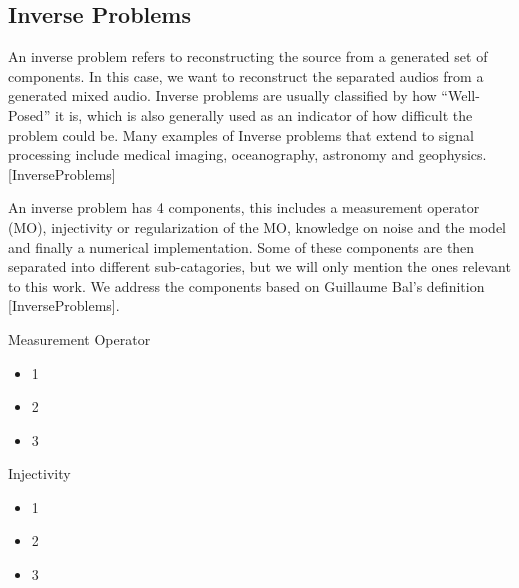 \documentclass{book}
\begin{document}
\subsection{Inverse Problems}
\qquad An inverse problem refers to reconstructing the source from a generated set of components.
In this case, we want to reconstruct the separated audios from a generated mixed audio.
Inverse problems are usually classified by how “Well-Posed” it is, which is also generally used as an indicator of how difficult the problem could be.
Many examples of Inverse problems that extend to signal processing include medical imaging, oceanography, astronomy and geophysics. [InverseProblems]
\par
An inverse problem has 4 components, this includes a measurement operator (MO), injectivity or regularization of the MO, knowledge on noise and the model and finally a numerical implementation.
Some of these components are then separated into different sub-catagories, but we will only mention the ones relevant to this work.
We address the components based on Guillaume Bal’s definition [InverseProblems].

\begin{center}
\noindent Measurement Operator
\end{center}
\begin{itemize}
    \item 1
    \item 2
    \item 3
\end{itemize}

\begin{center}
\noindent Injectivity
\end{center}
\begin{itemize}
    \item 1
    \item 2
    \item 3
\end{itemize}
\end{document}
